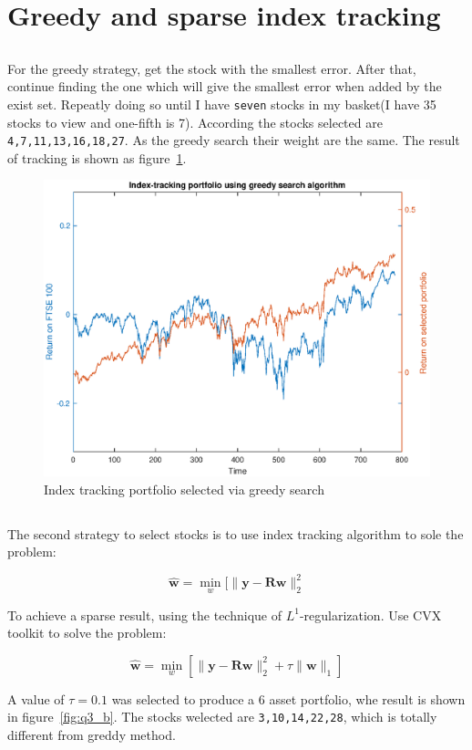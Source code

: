 \documentclass[a4paper, 12pt]{article}
\begin{document}
	\section{Greedy and sparse index tracking}
	\subsection{}
	For the greedy strategy, get the stock with the smallest error. After that, continue finding the one which will give the smallest error when added by the exist set. Repeatly doing so until I have \texttt{seven} stocks in my basket(I have 35 stocks to view and one-fifth is 7).
	According the stocks selected are \texttt{4,7,11,13,16,18,27}. As the greedy search their weight are the same. The result of tracking is shown as figure~\ref{fig:q3_a}.
	\begin{figure}
		\begin{center}
       		\includegraphics[width=0.45\linewidth]{stock_price/q3_a.eps}
		\end{center}
		\caption{Index tracking portfolio selected via greedy search}
   		\label{fig:q3_a}
	\end{figure}
	\subsection{}
	The second strategy to select stocks is to use index tracking algorithm to sole the problem:
	
	\[\mathbf{\hat{w}} = \min_{w} [\|\mathbf{y} - \mathbf{Rw}\|_2^2 \]
	
	To achieve a sparse result, using the technique of $L^1$-regularization. Use CVX toolkit to solve the problem:

	\[\mathbf{\hat{w}} = \min_{w} [\|\mathbf{y} - \mathbf{Rw}\|_2^2 + \tau \| \mathbf{w} \|_1]\]
	
    A value of $\tau = 0.1$ was selected to produce a 6 asset portfolio, whe result is shown in figure~\ref{fig:q3_b}. The stocks welected are \texttt{3,10,14,22,28}, which is totally different from greddy method.
		
\end{document}
